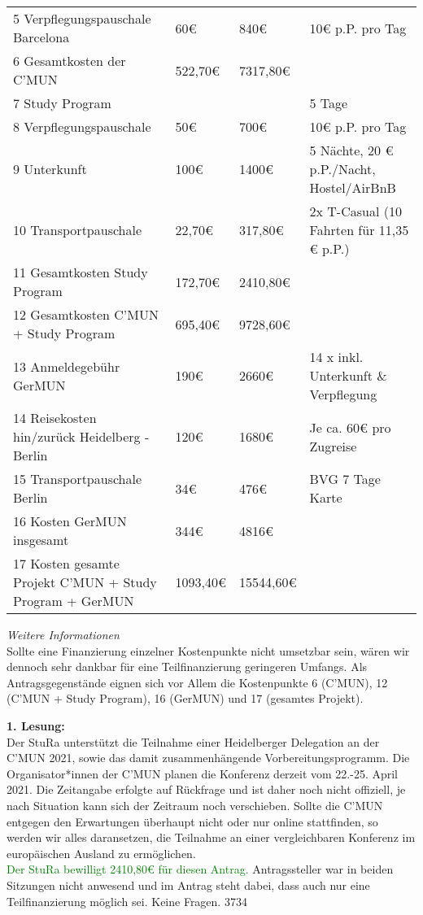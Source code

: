 {\begin{tabular}{p{4cm} p{1cm} p{1cm} p{9cm}}
        5 Verpflegungspauschale Barcelona & 60€ & 840€ & 10€ p.P. pro Tag\\
        6 Gesamtkosten der C'MUN & 522,70€ & 7317,80€ &\\
        7 Study Program & & & 5 Tage\\
        8 Verpflegungspauschale & 50€ & 700€ & 10€ p.P. pro Tag\\
        9 Unterkunft & 100€ & 1400€ & 5 Nächte, 20 € p.P./Nacht, Hostel/AirBnB\\
        10 Transportpauschale & 22,70€ & 317,80€ & 2x T-Casual (10 Fahrten für 11,35 € p.P.)\\
        11 Gesamtkosten Study Program & 172,70€ & 2410,80€ & \\
        12 Gesamtkosten C'MUN + Study Program & 695,40€ & 9728,60€ &\\
        13 Anmeldegebühr GerMUN & 190€ & 2660€ & 14 x inkl. Unterkunft \& Verpflegung\\
        14 Reisekosten hin/zurück Heidelberg - Berlin & 120€ & 1680€ & Je ca. 60€ pro Zugreise\\
        15 Transportpauschale Berlin & 34€ & 476€ & BVG 7 Tage Karte\\
        16 Kosten GerMUN insgesamt & 344€ & 4816€ &\\
        17 Kosten gesamte Projekt C'MUN + Study Program + GerMUN & 1093,40€ & 15544,60€ &\\
    \end{tabular}
    \emph{Weitere Informationen}\\
    Sollte eine Finanzierung einzelner Kostenpunkte nicht umsetzbar sein, wären wir dennoch sehr dankbar für eine Teilfinanzierung geringeren Umfangs. Als Antragsgegenstände eignen sich vor Allem die Kostenpunkte 6 (C’MUN), 12 (C’MUN + Study Program), 16 (GerMUN) und 17 (gesamtes Projekt).
}{
    \textbf{1. Lesung:}\\
    \ul{
        {}}
}
{
    Der StuRa unterstützt die Teilnahme einer Heidelberger Delegation an der C’MUN 2021,
    sowie das damit zusammenhängende Vorbereitungsprogramm. Die Organisator*innen der
    C’MUN planen die Konferenz derzeit vom 22.-25. April 2021. Die Zeitangabe erfolgte
    auf Rückfrage und ist daher noch nicht offiziell, je nach Situation kann sich der
    Zeitraum noch verschieben. Sollte die C’MUN entgegen den Erwartungen überhaupt nicht
    oder nur online stattfinden, so werden wir alles daransetzen, die Teilnahme an einer 
    vergleichbaren Konferenz im europäischen Ausland zu ermöglichen.\\
    \textcolor{green}{Der StuRa bewilligt 2410,80€ für diesen Antrag.}
}{
    Antragssteller war in beiden Sitzungen nicht anwesend und im Antrag steht dabei, dass auch nur eine Teilfinanzierung möglich sei.
}{
    Keine Fragen.
}{37}{3}{4}
